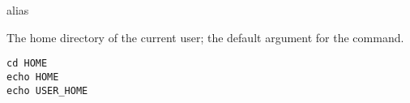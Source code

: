 %
 alias 

The home directory of the current user; the default argument for
the  command.

\begin{lstlisting}[style=Groovybash, label={lst:example_user_home}]
cd HOME
echo HOME
echo USER_HOME
\end{lstlisting}

